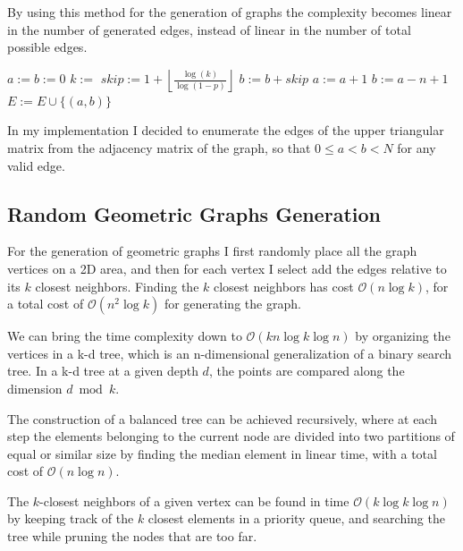 \documentclass{article}
\begin{document}
By using this method for the generation of graphs the complexity becomes linear in the number of generated edges, instead of linear in the number of total possible edges.

\begin{algorithm}
    \begin{algorithmic}
         
            \State $a:= b := 0$
                \State $k := $ 
                \State $skip := 1 + \left\lfloor\frac{\log(k)}{\log(1-p)}\right\rfloor$
                \State $b := b + skip$
                    \State $a := a + 1$
                    \State $b := a - n + 1$
                \EndWhile
                 \Return
                \EndIf
                \State $E := E \cup \{(a,b)\}$
            \EndWhile
        \EndFunction
    \end{algorithmic}
\end{algorithm}

In my implementation I decided to enumerate the edges of the upper triangular matrix from the adjacency matrix of the graph, so that $0 \leq a < b < N$ for any valid edge.

\subsection{Random Geometric Graphs Generation}

For the generation of geometric graphs I first randomly place all the graph vertices on a 2D area, and then for each vertex I select add the edges relative to its $k$ closest neighbors. Finding the $k$ closest neighbors has cost $\mathcal O(n\log k)$, for a total cost of $\mathcal O(n^2\log k)$ for generating the graph.

We can bring the time complexity down to $\mathcal O(kn\log k\log n)$ by organizing the vertices in a k-d tree, which is an n-dimensional generalization of a binary search tree. In a k-d tree at a given depth $d$, the points are compared along the dimension $d \bmod k$.

The construction of a balanced tree can be achieved recursively, where at each step the elements belonging to the current node are divided into two partitions of equal or similar size by finding the median element in linear time, with a total cost of $\mathcal O(n\log n)$.

The $k$-closest neighbors of a given vertex can be found in time $\mathcal O(k\log k\log n)$ by keeping track of the $k$ closest elements in a priority queue, and searching the tree while pruning the nodes that are too far.
\end{document}
